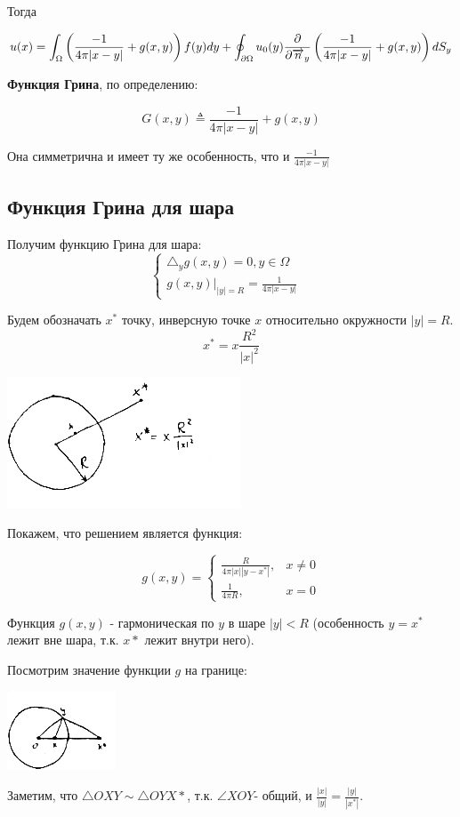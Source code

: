 Тогда

$$u(x) = \int_{\Omega} {\left(\frac{-1}{4 \pi |x-y|} +g(x,y)\right) f(y) dy} + \oint_{\partial \Omega} {u_0(y) \frac{\partial}{\partial \overrightarrow{n}_y} \left(\frac{-1}{4 \pi |x-y|}+g(x,y)\right)dS_y}
$$

\textbf{Функция Грина}, по определению:

$$G(x,y) \triangleq  \frac{-1}{4 \pi |x-y|} + g(x,y) $$

Она симметрична и имеет ту же особенность, что и $\frac{-1}{4 \pi |x-y|}$





\subsection{Функция Грина для шара}


Получим функцию Грина для шара:
\[\begin{cases}
   \triangle_y g(x,y) = 0, y \in \Omega \\
   g(x,y)|_{|y|=R} = \frac{1}{4 \pi |x-y|}& 
\end{cases}\]  

Будем обозначать $x^*$ точку, инверсную точке $x$ относительно окружности $|y|=R$.
$$x^* = x \frac{R^2}{|x|^2}$$
\begin{center}
\includegraphics{20_1_new}
\end{center}
Покажем, что решением является функция:

\[g(x,y) = \begin{cases}
   \frac{R}{4 \pi |x| |y-x^*|},   & x \ne 0 \\
   \frac{1}{4 \pi R},& x=0
\end{cases}\]

Функция $g(x,y)$ - гармоническая по $y$ в шаре $|y|<R$ (особенность $y=x^*$ лежит вне шара, т.к. $x*$ лежит внутри него).

Посмотрим значение функции $g$ на границе:
\begin{center}
\includegraphics{20_2_new}
\end{center}
Заметим, что $\triangle OXY \sim \triangle OYX*$, т.к. $\angle XOY$- общий, и $\frac{|x|}{|y|}  =\frac{|y|}{|x^*|}$.

